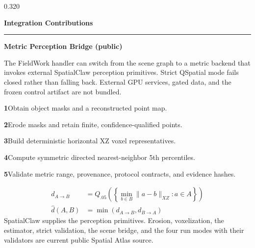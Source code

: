 \documentclass{beamer}
\newenvironment{possection}[2]{%
  \par\vspace{0.10cm}%
  \noindent{\color{ncgreendark}\bfseries\large #1}\hspace{0.42em}%
  {\color{ncink}\bfseries\large #2}\par\vspace{-0.20cm}%
  \noindent\textcolor{ncline}{\rule{\linewidth}{0.9pt}}\par\vspace{0cm}%
  \begin{minipage}{\linewidth}%
}{%
  \end{minipage}\par\vspace{0.40cm}%
}
\newcommand{\possub}[2]{%
  \par\vspace{0.02cm}%
  \noindent{\color{ncgreendark}\bfseries #1}\hspace{0.38em}%
  {\color{ncink}\bfseries #2}\par\vspace{0.07cm}%
}
\newcommand{\stp}[1]{{\ttfamily\bfseries\color{ncgreendark}#1}}
\begin{document}
\begin{frame}[t]
\begin{columns}[t,onlytextwidth]
\begin{column}{0.320\textwidth}
  \begin{possection}{7.}{Integration Contributions}
    \possub{7.1}{Metric Perception Bridge (public)}
    The FieldWork handler can switch from the scene graph to a metric backend that
    invokes external SpatialClaw perception primitives. Strict QSpatial mode fails
    closed rather than falling back. External GPU services, gated data, and the
    frozen control artifact are not bundled.
    \par\vspace{0.16cm}
    \stp{1}\hspace{0.45em}Obtain object masks and a reconstructed point map.\par
    \stp{2}\hspace{0.45em}Erode masks and retain finite, confidence-qualified points.\par
    \stp{3}\hspace{0.45em}Build deterministic horizontal XZ voxel representatives.\par
    \stp{4}\hspace{0.45em}Compute symmetric directed nearest-neighbor 5th percentiles.\par
    \stp{5}\hspace{0.45em}Validate metric range, provenance, protocol contracts,
    and evidence hashes.\par
    \vspace{0.10cm}
    \begin{align}
      d_{A\rightarrow B}
        &= Q_{.05}\!\left(
          \left\{\min_{b\in B}\lVert a-b\rVert_{XZ}:a\in A\right\}
        \right)\\
      \hat d(A,B) &= \min(d_{A\rightarrow B},d_{B\rightarrow A})
    \end{align}
    \vspace{-0.20cm}
    {\color{ncmuted}\normalsize SpatialClaw supplies the perception primitives.
    Erosion, voxelization, the estimator, strict validation, the scene bridge, and
    the four run modes with their validators are current public Spatial Atlas source.}
    \par\vspace{0.16cm}



\end{possection}
\end{column}
\end{columns}
\end{frame}
\end{document}
